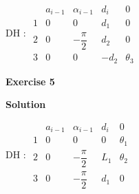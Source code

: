 \documentclass[8pt]{article}
\begin{document}
\begin{list}{()~}{}
DH :
$ \begin{array}{ccccc}
& a_{i-1} & \alpha_{i-1} & d_i & 0\\
1 & 0 & 0 & d_1 & 0 \\
2 & 0 & -\dfrac{\pi}{2} & d_2 & 0 \\
3 & 0 & 0 & -d_2 & \theta_3
\end{array} $

\textbf{Exercise 5}		
		
\textbf{Solution}

DH :
$ \begin{array}{ccccc}
& a_{i-1} & \alpha_{i-1} & d_i & 0\\
1 & 0 & 0 & 0 & \theta_1 \\
2 & 0 & -\dfrac{\pi}{2} & L_1 & \theta_2 \\
3 & 0 & -\dfrac{\pi}{2} & d_1 & 0
\end{array} $

\medskip

\end{list}
\end{document}
